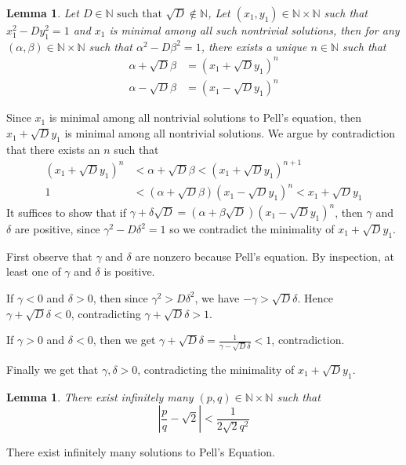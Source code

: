 \documentclass[11pt]{article}
\newtheorem{lemma}[thm]{Lemma}
\theoremstyle{definition}
\newcommand{\st}[0]{\text{ such that }}
\newcommand{\abs}[1]{\left\lvert#1\right\rvert} %
\newcommand{\NN}{\mathbb{N}}
\begin{document}
\begin{lemma}
	Let $D \in \NN \st \sqrt{D} \notin \NN$, Let $(x_1, y_1)\in\NN\times\NN$ such that $x_1^2 - Dy_1^2 = 1$
	and $x_1$ is minimal among all such nontrivial solutions, then for any $(\alpha,\beta)\in\NN\times\NN$
	such that $\alpha^2 - D \beta^2 = 1$, there exists a unique $n\in\NN$ such that 
	\begin{align*}
		\alpha + \sqrt{D} \beta &= (x_1 + \sqrt{D} y_1)^n \\
		\alpha - \sqrt{D} \beta &= (x_1 - \sqrt{D} y_1)^n 
	\end{align*}
\end{lemma}
\proof
	Since $x_1$ is minimal among all nontrivial solutions to Pell's equation, 
	then $x_1 + \sqrt{D} y_1$ is minimal among all nontrivial solutions.
	We argue by contradiction that there exists an $n$ such that 
	\begin{align*} 
		(x_1+\sqrt{D}y_1)^n &< \alpha + \sqrt{D} \beta < (x_1 + \sqrt{D}y_1)^{n+1} \\
		1 &< (\alpha + \sqrt{D} \beta)(x_1 - \sqrt{D} y_1)^n < x_1 + \sqrt{D} y_1
	\end{align*}
	It suffices to show that if $\gamma + \delta \sqrt{D} = (\alpha + \beta\sqrt{D})(x_1 - \sqrt{D}y_1)^n$, 
	then $\gamma$ and $\delta$ are positive, since $\gamma^2 - D \delta^2 = 1$ so we contradict
	the minimality of $x_1 + \sqrt{D}y_1$. 

	First observe that $\gamma$ and $\delta$ are nonzero because Pell's equation.
	By inspection, at least one of $\gamma$ and $\delta$ is positive.

	If $\gamma < 0$ and $\delta > 0$, then since $\gamma^2 > D\delta^2$, we have $-\gamma > \sqrt{D}\delta$.
	Hence $\gamma + \sqrt{D}\delta < 0$, contradicting $\gamma + \sqrt{D}\delta > 1$.

	If $\gamma > 0$ and $\delta < 0$, then we get 
	$\gamma + \sqrt{D}\delta = \frac1{\gamma - \sqrt{D}\delta} < 1$,
	contradiction.
	
	Finally we get that $\gamma,\delta > 0$, contradicting the minimality of $x_1+\sqrt{D}y_1$.
\qedhere


\begin{lemma}
	There exist infinitely many $(p,q) \in \NN\times\NN$ such that 
	$$ \abs{\frac{p}{q} - \sqrt{2}} < \frac1{2\sqrt{2} q^2} $$
\end{lemma}
\proof
	There exist infinitely many solutions to Pell's Equation.
\end{document}
